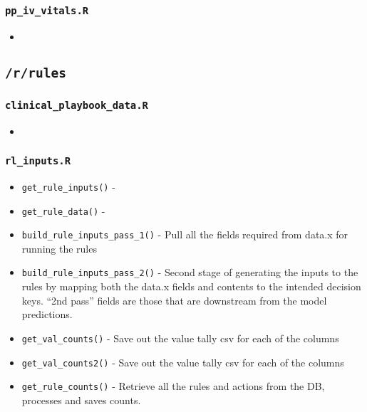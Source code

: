 \documentclass[
]{book}
\providecommand{\tightlist}{%
  \setlength{\itemsep}{0pt}\setlength{\parskip}{0pt}}
\begin{document}
\hypertarget{pp_iv_vitals.r}{%
\subsubsection{\texorpdfstring{\texttt{pp\_iv\_vitals.R}}{pp\_iv\_vitals.R}}\label{pp_iv_vitals.r}}

\begin{itemize}
\item
\end{itemize}

\hypertarget{rrules-2}{%
\subsection{\texorpdfstring{\texttt{/r/rules}}{/r/rules}}\label{rrules-2}}

\hypertarget{clinical_playbook_data.r}{%
\subsubsection{\texorpdfstring{\texttt{clinical\_playbook\_data.R}}{clinical\_playbook\_data.R}}\label{clinical_playbook_data.r}}

\begin{itemize}
\item
\end{itemize}

\hypertarget{rl_inputs.r-1}{%
\subsubsection{\texorpdfstring{\texttt{rl\_inputs.R}}{rl\_inputs.R}}\label{rl_inputs.r-1}}

\begin{itemize}
\tightlist
\item
  \texttt{get\_rule\_inputs()} -
\item
  \texttt{get\_rule\_data()} -
\item
  \texttt{build\_rule\_inputs\_pass\_1()} - Pull all the fields required from data.x for running the rules
\item
  \texttt{build\_rule\_inputs\_pass\_2()} - Second stage of generating the inputs to the rules by mapping both the data.x fields and contents to the intended decision keys. ``2nd pass'' fields are those that are downstream from the model predictions.
\item
  \texttt{get\_val\_counts()} - Save out the value tally csv for each of the columns
\item
  \texttt{get\_val\_counts2()} - Save out the value tally csv for each of the columns
\item
  \texttt{get\_rule\_counts()} - Retrieve all the rules and actions from the DB, processes and saves counts.
\end{itemize}
\end{document}
